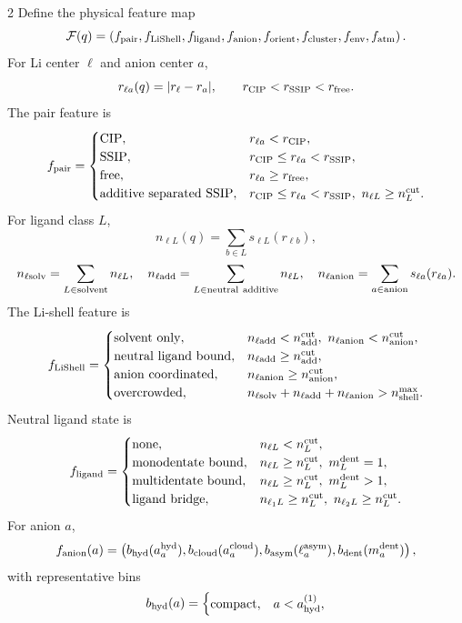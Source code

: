 \documentclass[10pt]{article}
\begin{document}
\begin{multicols}{2}
Define the physical feature map
\[
\mathcal F(q)=
\left(
f_{\rm pair},
f_{\rm LiShell},
f_{\rm ligand},
f_{\rm anion},
f_{\rm orient},
f_{\rm cluster},
f_{\rm env},
f_{\rm atm}
\right).
\]
For Li center \(\ell\) and anion center \(a\),
\[
r_{\ell a}(q)=|r_\ell-r_a|,
\qquad
r_{\rm CIP}<r_{\rm SSIP}<r_{\rm free}.
\]
The pair feature is
\[
f_{\rm pair}=
\begin{cases}
{\rm CIP}, & r_{\ell a}<r_{\rm CIP},\\
{\rm SSIP}, & r_{\rm CIP}\le r_{\ell a}<r_{\rm SSIP},\\
{\rm free}, & r_{\ell a}\ge r_{\rm free},\\
{\rm additive\ separated\ SSIP}, &
r_{\rm CIP}\le r_{\ell a}<r_{\rm SSIP},\
n_{\ell L}\ge n_L^{\rm cut}.
\end{cases}
\]
For ligand class \(L\),
\[
n_{\ell L}(q)=\sum_{b\in L}s_{\ell L}(r_{\ell b}),
\]
\[
n_{\ell{\rm solv}}=\sum_{L\in{\rm solvent}}n_{\ell L},
\quad
n_{\ell{\rm add}}=\sum_{L\in{\rm neutral\ additive}}n_{\ell L},
\quad
n_{\ell{\rm anion}}=\sum_{a\in{\rm anion}}s_{\ell a}(r_{\ell a}).
\]
The Li-shell feature is
\[
f_{\rm LiShell}=
\begin{cases}
{\rm solvent\ only}, &
n_{\ell{\rm add}}<n_{\rm add}^{\rm cut},\
n_{\ell{\rm anion}}<n_{\rm anion}^{\rm cut},\\
{\rm neutral\ ligand\ bound}, &
n_{\ell{\rm add}}\ge n_{\rm add}^{\rm cut},\\
{\rm anion\ coordinated}, &
n_{\ell{\rm anion}}\ge n_{\rm anion}^{\rm cut},\\
{\rm overcrowded}, &
n_{\ell{\rm solv}}+n_{\ell{\rm add}}+n_{\ell{\rm anion}}
>n_{\rm shell}^{\max}.
\end{cases}
\]
Neutral ligand state is
\[
f_{\rm ligand}=
\begin{cases}
{\rm none}, & n_{\ell L}<n_L^{\rm cut},\\
{\rm monodentate\ bound}, &
n_{\ell L}\ge n_L^{\rm cut},\ m_L^{\rm dent}=1,\\
{\rm multidentate\ bound}, &
n_{\ell L}\ge n_L^{\rm cut},\ m_L^{\rm dent}>1,\\
{\rm ligand\ bridge}, &
n_{\ell_1L}\ge n_L^{\rm cut},\
n_{\ell_2L}\ge n_L^{\rm cut}.
\end{cases}
\]
For anion \(a\),
\[
f_{\rm anion}(a)=
\left(
b_{\rm hyd}(a_a^{\rm hyd}),
b_{\rm cloud}(a_a^{\rm cloud}),
b_{\rm asym}(\ell_a^{\rm asym}),
b_{\rm dent}(m_a^{\rm dent})
\right),
\]
with representative bins
\[
b_{\rm hyd}(a)=
\begin{cases}
{\rm compact}, & a<a_{\rm hyd}^{(1)},\\

\end{cases}\]
\end{multicols}
\end{document}
